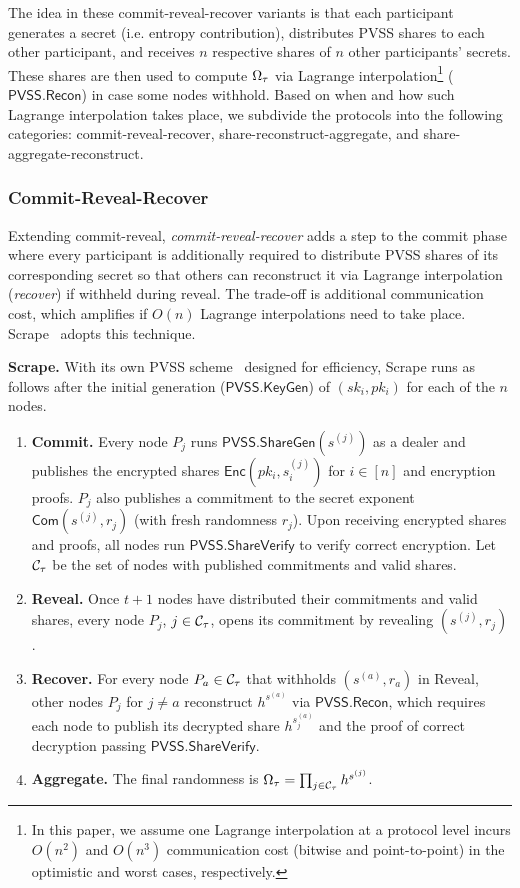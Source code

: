 The idea in these commit-reveal-recover variants is that each participant generates a secret (i.e. entropy contribution), distributes PVSS shares to each other participant, and receives $n$ respective shares of $n$ other participants' secrets. These shares are then used to compute $\Omega_\tau$ via Lagrange interpolation\footnote{In this paper, we assume one Lagrange interpolation at a protocol level incurs $O(n^2)$ and $O(n^3)$ communication cost (bitwise and point-to-point) in the optimistic and worst cases, respectively.} ($\mathsf{PVSS.Recon}$) in case some nodes withhold. Based on when and how such Lagrange interpolation takes place, we subdivide the protocols into the following categories: commit-reveal-recover, share-reconstruct-aggregate, and share-aggregate-reconstruct.

\subsubsection{Commit-Reveal-Recover}
Extending commit-reveal, \textit{commit-reveal-recover} adds a step to the commit phase where every participant is additionally required to distribute PVSS shares of its corresponding secret so that others can reconstruct it via Lagrange interpolation (\textit{recover}) if withheld during reveal. The trade-off is additional communication cost, which amplifies if $O(n)$ Lagrange interpolations need to take place. Scrape~\cite{cascudo2017scrape} adopts this technique.

\noindent\textbf{Scrape.} With its own PVSS scheme~\cite{cascudo2017scrape} designed for efficiency, Scrape runs as follows after the initial generation ($\mathsf{PVSS.KeyGen}$) of $(sk_i, pk_i)$ for each of the $n$ nodes.
\begin{enumerate}
\item \textbf{Commit.} Every node $P_j$ runs $\mathsf{PVSS.ShareGen}(s^{(j)})$ as a dealer and publishes the encrypted shares $\mathsf{Enc}(pk_i, s^{(j)}_i)$ for $i \in [n]$ and encryption proofs. $P_j$ also publishes a commitment to the secret exponent $\mathsf{Com}(s^{(j)}, r_j)$ (with fresh randomness $r_j$). Upon receiving encrypted shares and proofs, all nodes run $\mathsf{PVSS.ShareVerify}$ to verify correct encryption. Let $\mathcal{C}_\tau$ be the set of nodes with published commitments and valid shares.
\item \textbf{Reveal.} Once $t + 1$ nodes have distributed their commitments and valid shares, every node $P_j$, $j \in \mathcal{C}_\tau$, opens its commitment by revealing $(s^{(j)}, r_j)$.
\item \textbf{Recover.} For every node $P_a \in \mathcal{C}_\tau$ that withholds $(s^{(a)}, r_a)$ in Reveal, other nodes $P_j$ for $j \neq a$ reconstruct $h^{s^{(a)}}$ via $\mathsf{PVSS.Recon}$, which requires each node to publish its decrypted share $h^{s_j^{(a)}}$ and the proof of correct decryption passing $\mathsf{PVSS.ShareVerify}$.
\item \textbf{Aggregate.} The final randomness is $\Omega_\tau = \prod_{j \in \mathcal{C}_\tau} h^{s^{(j)}}$.
\end{enumerate}

